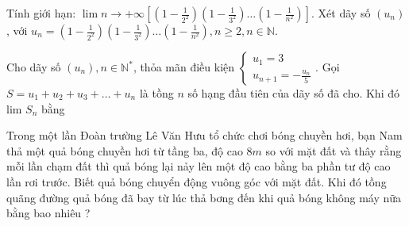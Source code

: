 \begin{bt}%
	Tính giới hạn: $\lim \limits{n \to +\infty}\left[\left(1-\frac{1}{2^2}\right)\left(1-\frac{1}{3^2}\right) \ldots\left(1-\frac{1}{n^2}\right)\right]$.
	Xét dãy số $\left(u_n\right)$, với $u_n=\left(1-\frac{1}{2^2}\right)\left(1-\frac{1}{3^2}\right) \ldots\left(1-\frac{1}{n^2}\right), n \geq 2, n \in \mathbb{N}$.
\end{bt}
\begin{bt}%
	
	Cho dãy số $\left(u_n\right), n \in \mathbb{N}^*$, thỏa mãn điều kiện $\left\{\begin{array}{c}u_1=3 \\ u_{n+1}=-\frac{u_n}{5}\end{array}\right.$. Gọi $S=u_1+u_2+u_3+\ldots+u_n$ là tồng $n$ số hạng đầu tiên của dãy số đã cho. Khi đó lim $S_n$ bằng
\end{bt}
\begin{bt}%
	Trong một lần Đoàn trường Lê Văn Hưu tổ chức chơi bóng chuyền hơi, bạn Nam thả một quả bóng chuyền hơi từ tầng ba, độ cao $8 m$ so với mặt đất và thây rằng mỗi lần chạm đất thì quả bóng lại nảy lên một độ cao bằng ba phần tư độ cao lần rơi trước. Biết quả bóng chuyển động vuông góc với mặt đất. Khi đó tồng quãng đường quả bóng đã bay từ lúc thả bơng đến khi quả bóng không máy nữa bằng bao nhiêu ?
\end{bt}
